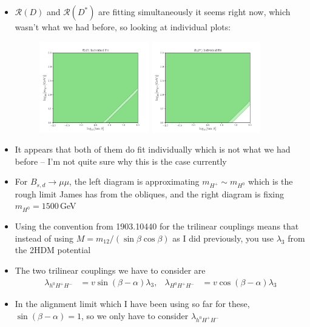 \documentclass[11pt]{article}
\begin{document}
\begin{itemize}
\begin{figure}[H]
        \end{figure}
    \item $\mathcal{R}(D)$ and $\mathcal{R}(D^*)$ are fitting simultaneously it seems right now, which wasn't what we had before, so looking at individual plots:
        \begin{figure}[H]
            \centering
            \includegraphics[width=0.45\textwidth]{rd_plot.png}
            \includegraphics[width=0.45\textwidth]{rdst_plot.png}
        \end{figure}
    \item It appears that both of them do fit individually which is not what we had before -- I'm not quite sure why this is the case currently
    \item For $B_{s,d}\to\mu\mu$, the left diagram is approximating $m_{H^+}\sim m_{H^0}$ which is the rough limit James has from the obliques, and the right diagram is fixing $m_{H^0}=1500\,$GeV
    \item Using the convention from 1903.10440 for the trilinear couplings means that instead of using $M=m_{12}/(\sin\beta\cos\beta)$ as I did previously, you use $\lambda_3$ from the 2HDM potential
    \item The two trilinear couplings we have to consider are
        \begin{align*}
            \lambda_{h^0 H^+ H^-} &= v\sin(\beta-\alpha)\lambda_3, &
            \lambda_{H^0 H^+ H^-} &= v\cos(\beta-\alpha)\lambda_3 
        \end{align*}
    \item In the alignment limit which I have been using so far for these, $\sin(\beta-\alpha)=1$, so we only have to consider $\lambda_{h^0 H^+ H^-}$ 

\end{itemize}
\end{document}
